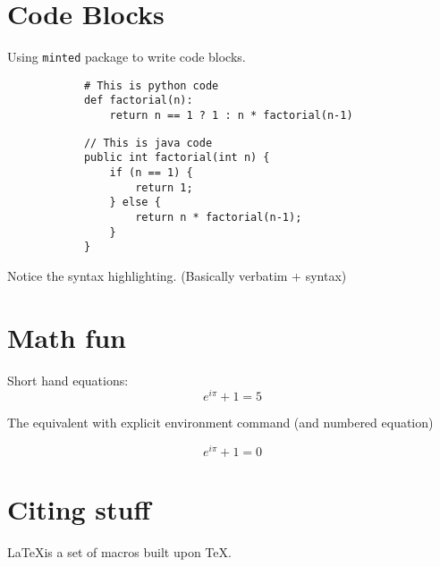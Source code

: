 \documentclass[12pt]{article}
\begin{document}
    \section{Code Blocks}

        Using \texttt{minted} package to write code blocks.

        \begin{verbatim}
            # This is python code
            def factorial(n):
                return n == 1 ? 1 : n * factorial(n-1)
        \end{verbatim}

        \begin{verbatim}
            // This is java code
            public int factorial(int n) {
                if (n == 1) {
                    return 1;
                } else {
                    return n * factorial(n-1);
                }
            }
        \end{verbatim}

        Notice the syntax highlighting. (Basically verbatim + syntax)

    \section{Math fun}
        Short hand equations: \[e^{i \pi} + 1 = 5\]

        The equivalent with explicit environment command (and numbered equation)

        \begin{equation}
            e^{i \pi} + 1 = 0
        \end{equation}
    
    \section{Citing stuff}
        \LaTeX is a set of macros built upon \TeX \cite{texbook}.
    
    
    
\end{document}
